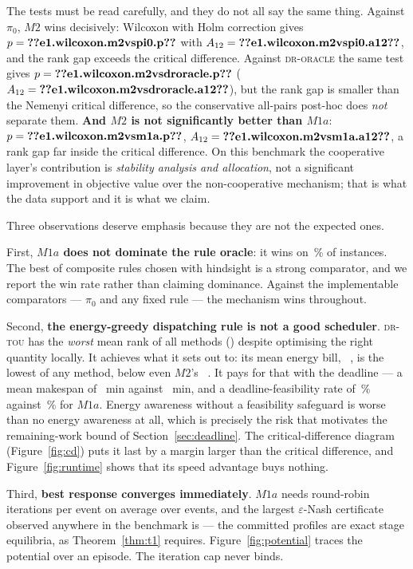 \documentclass[preprint, 3p, review, 12pt]{elsarticle}
\providecommand{\euro}{\texteuro}
\theoremstyle{definition}
\begin{document}
The tests must be read carefully, and they do not all say the same thing. Against $\pi_0$,
$M2$ wins decisively: Wilcoxon with Holm correction gives
$p=\jnum{e1.wilcoxon.m2vspi0.p}$ with $A_{12}=\jnum{e1.wilcoxon.m2vspi0.a12}$, and the rank
gap exceeds the critical difference. Against \textsc{dr-oracle} the same test gives
$p=\jnum{e1.wilcoxon.m2vsdroracle.p}$ ($A_{12}=\jnum{e1.wilcoxon.m2vsdroracle.a12}$), but
the rank gap is smaller than the Nemenyi critical difference, so the conservative
all-pairs post-hoc does \emph{not} separate them. \textbf{And $M2$ is not significantly
better than $M1a$}: $p=\jnum{e1.wilcoxon.m2vsm1a.p}$,
$A_{12}=\jnum{e1.wilcoxon.m2vsm1a.a12}$, a rank gap far inside the critical difference. On
this benchmark the cooperative layer's contribution is \emph{stability analysis and
allocation}, not a significant improvement in objective value over the non-cooperative
mechanism; that is what the data support and it is what we claim.

Three observations deserve emphasis because they are not the expected ones.

First, \textbf{$M1a$ does not dominate the rule oracle}: it wins on
\,\% of instances. The best of
 composite rules chosen with hindsight is a strong comparator, and we
report the win rate rather than claiming dominance. Against the implementable comparators ---
$\pi_0$ and any fixed rule --- the mechanism wins throughout.

Second, \textbf{the energy-greedy dispatching rule is not a good scheduler}. \textsc{dr-tou}
has the \emph{worst} mean rank of all methods () despite optimising the
right quantity locally. It achieves what it sets out to: its mean energy bill,
~\euro, is the lowest of any method, below even $M2$'s
~\euro. It pays for that with the deadline --- a mean makespan of
~min against ~min, and a
deadline-feasibility rate of \,\% against
\,\% for $M1a$. Energy awareness without a feasibility safeguard
is worse than no energy awareness at all, which is precisely the risk that motivates the
remaining-work bound of Section~\ref{sec:deadline}. The critical-difference diagram
(Figure~\ref{fig:cd}) puts it last by a margin larger than the critical difference, and
Figure~\ref{fig:runtime} shows that its speed advantage buys nothing.

Third, \textbf{best response converges immediately}. $M1a$ needs
 round-robin iterations per event on average over
 events, and the largest $\varepsilon$-Nash certificate observed
anywhere in the benchmark is  --- the committed profiles are exact
stage equilibria, as Theorem~\ref{thm:t1} requires. Figure~\ref{fig:potential} traces the
potential over an episode. The iteration cap never binds.
\end{document}
